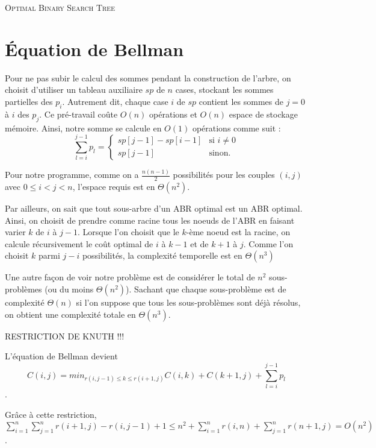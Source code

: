 \documentclass[12pt,a4paper]{article}
\begin{document}
	\begin{center}
		\textsc{\Large Optimal Binary Search Tree}\\[0.25cm]
	\end{center}
	\section{Équation de Bellman}
	Pour ne pas subir le calcul des sommes pendant la construction de l'arbre, on choisit d'utiliser un tableau auxiliaire $sp$ de $n$ cases, stockant les sommes partielles des $p_i$. Autrement dit, chaque case $i$ de $sp$ contient les sommes de $j = 0$ à $i$ des $p_j$. Ce pré-travail coûte $O(n)$ opérations et $O(n)$ espace de stockage mémoire. Ainsi, notre somme se calcule en $O(1)$ opérations	 comme suit : $$\sum \limits_{l = i}^{j - 1} p_l =
	\left\{
		\begin{array}{ll}
		    sp[j - 1] - sp[i - 1] & \mbox{si } i \neq 0 \\
		    sp[j - 1] & \mbox{sinon.}
		\end{array}
	\right.$$

	Pour notre programme, comme on a $\frac{n(n-1)}{2}$ possibilités pour les couples $(i, j)$ avec $0 \leq i < j < n$, l'espace requis est en $\Theta(n^2)$.

	Par ailleurs, on sait que tout sous-arbre d'un ABR optimal est un ABR optimal. Ainsi, on choisit de prendre comme racine tous les noeuds de l'ABR en faisant varier $k$ de $i$ à $j - 1$. Lorsque l'on choisit que le $k$-ème noeud est la racine, on calcule récursivement le coût optimal de $i$ à $k - 1$ et de $k + 1$ à $j$. Comme l'on choisit $k$ parmi $j - i$ possibilités, la complexité temporelle est en $\Theta(n^3)$

	Une autre façon de voir notre problème est de considérer le total de $n^2$ sous-problèmes (ou du moins $\Theta(n^2)$). Sachant que chaque sous-problème est de complexité $\Theta(n)$ si l'on suppose que tous les sous-problèmes sont déjà résolus, on obtient une complexité totale en $\Theta(n^3)$.

	RESTRICTION DE KNUTH !!!

	L'équation de Bellman devient $$C(i, j) = min_{r(i, j -1) \leq k \leq r(i + 1, j)} C(i, k) + C(k + 1, j) + \sum \limits_{l = i}^{j - 1} p_l$$.

	Grâce à cette restriction, $\sum \limits_{i = 1}^{n} \sum \limits_{j = 1}^{n} r(i + 1, j) - r(i, j - 1) + 1 \leq n^2 + \sum \limits_{i = 1}^{n} r(i, n) + \sum \limits_{j = 1}^{n} r(n + 1, j) = O(n^2)$.
\end{document}
